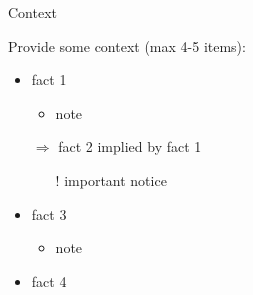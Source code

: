 \documentclass[presentation]{beamer}\mode<presentation>{\usetheme{blackAMSBolognaFC}}
\begin{document}
\begin{frame}[c]{Context}
    
    Provide some context (max 4-5 items):
    \vfill
    \begin{itemize}
        \item fact 1
        \begin{itemize}
            \item note
        \end{itemize}
        
        \vfill
        
        \item[$\Rightarrow$] fact 2 implied by fact 1
        \begin{itemize}
            \item[!] important \alert{notice}
        \end{itemize}
        
        \vfill
        
        \item fact 3
        \begin{itemize}
            \item note
        \end{itemize}
        
        \vfill
        
        \item fact 4
        
    \end{itemize}
\end{frame}
\end{document}

